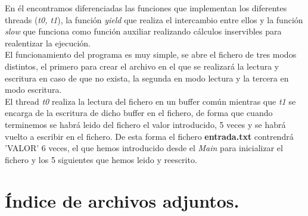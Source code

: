 \documentclass[12pt,a4paper,helvetica,titlepage]{article}
\begin{document}
En él encontramos diferenciadas las funciones que implementan los diferentes threads
(\emph{t0, t1}), la función \emph{yield} que realiza el intercambio entre ellos y la
función \emph{slow} que funciona como función auxiliar realizando cálculos inservibles
para realentizar la ejecución.\\

El funcionamiento del programa es muy simple, se abre el fichero de tres modos distintos,
el primero para crear el archivo en el que se realizará la lectura y escritura en caso de
que no exista, la segunda en modo lectura y la tercera en modo escritura.\\

El thread \emph{t0} realiza la lectura del fichero en un buffer común mientras que
\emph{t1} se encarga de la escritura de dicho buffer en el fichero, de forma que cuando
terminemos se habrá leido del fichero el valor introducido, 5 veces y se habrá vuelto a
escribir en el fichero.
De esta forma el fichero \textbf{entrada.txt} contrendrá 'VALOR' 6 veces, el que hemos
introducido desde el \emph{Main} para inicializar el fichero y los 5 siguientes que hemos
leido y reescrito.

\newpage

\section{Índice de archivos adjuntos.}
\end{document}
